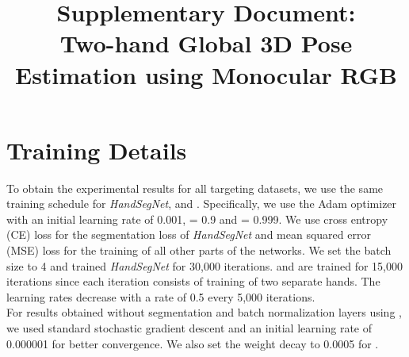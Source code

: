 \documentclass[10pt,twocolumn,letterpaper]{article}
\begin{document}
\nocite{Liu}
{\small


}

\clearpage
\onecolumn
\title{\vspace{-2.0cm}Supplementary Document:\\
Two-hand Global 3D Pose Estimation using Monocular RGB
}

\author{}
\date{}
\maketitle
\vspace{-3.0cm}
\setcounter{section}{0}
\section{Training Details}
\indent To obtain the experimental results for all targeting datasets, we use the same training schedule for \textit{HandSegNet}, \textit{} and \textit{}. Specifically, we use the Adam optimizer with an initial learning rate of 0.001,  = 0.9 and  = 0.999. We use cross entropy (CE) loss for the segmentation loss of \textit{HandSegNet} and mean squared error (MSE) loss for the training of all other parts of the networks. We set the batch size to 4 and  trained \textit{HandSegNet} for 30,000 iterations. \textit{} and \textit{} are trained for 15,000 iterations since each iteration consists of training of two separate hands. The learning rates decrease with a rate of 0.5 every 5,000 iterations.\\
\indent For results obtained without segmentation and batch normalization layers using \textit{}, we used standard stochastic gradient descent and an initial learning rate of 0.000001 for better convergence. We also set the weight decay to 0.0005 for .
\end{document}
